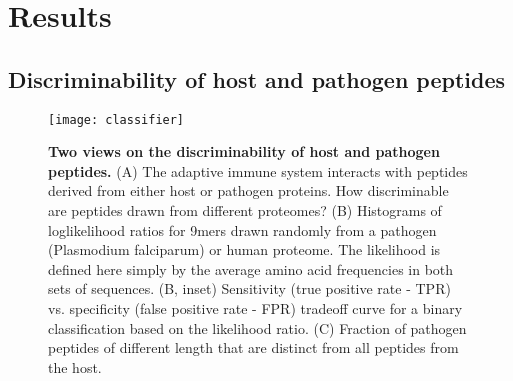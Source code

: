 \documentclass[superscriptaddress,twocolumn,pre]{revtex4}
\newcommand{\<}{\langle}
\renewcommand{\>}{\rangle}
\begin{document}

\section{Results}

\subsection{Discriminability of host and pathogen peptides}


\begin{figure}
    \texttt{[image: classifier]}
        \caption{{\bf Two views on the discriminability of host and pathogen peptides.} (A) The adaptive immune system interacts with peptides derived from either host or pathogen proteins. How discriminable are peptides drawn from different proteomes? (B) Histograms of loglikelihood ratios for 9mers drawn randomly from a pathogen (Plasmodium falciparum) or human proteome. The likelihood is defined here simply by the average amino acid frequencies in both sets of sequences. (B, inset) Sensitivity (true positive rate - TPR) vs. specificity (false positive rate - FPR) tradeoff curve for a binary classification based on the likelihood ratio. (C) Fraction of pathogen peptides of different length that are distinct from all peptides from the host.
    \label{figclassifier}
    }
\end{figure}
\end{document}
